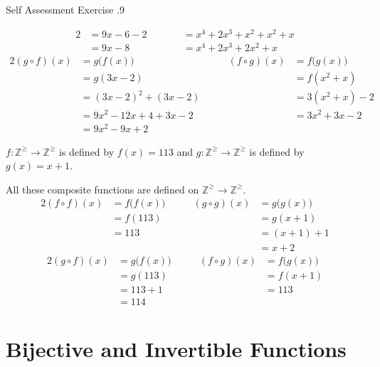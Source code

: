 \documentclass[\main/notes.tex]{subfiles}
\begin{document}
\begin{exercise}{Self Assessment Exercise \thechapter.9}
\begin{questions}
\begin{questions}
\begin{answer}
\begin{alignat*}{2}
										&= 9x - 6 - 2 \qquad & &= x^{4} + 2x^{3} + x^{2} + x^{2} + x\\
										&= 9x - 8 \qquad & &= x^{4} + 2x^{3} + 2x^{2} + x
									\end{alignat*}
									\begin{alignat*}{2}
										(g \circ f)(x) &= g\bigl(f(x)\bigr) \qquad & (f \circ g)(x) &= f\bigl(g(x)\bigr)\\
										&= g(3x - 2) \qquad & &= f\left(x^{2} + x\right)\\
										&= (3x - 2)^{2} + (3x - 2) \qquad & &= 3\left(x^{2} + x\right) - 2\\
										&= 9x^{2} - 12x + 4 + 3x - 2 \qquad & &= 3x^{2} + 3x - 2\\
										&= 9x^{2} - 9x + 2
									\end{alignat*}
								\end{answer}
							\pagebreak
							\item $f: \mathbb{Z}^{\geq} \rightarrow \mathbb{Z}^{\geq}$ is defined by $f(x) = 113$ and $g: \mathbb{Z}^{\geq} \rightarrow \mathbb{Z}^{\geq}$ is defined by $g(x) = x + 1$.\\
								\begin{answer}
									All these composite functions are defined on $\mathbb{Z}^{\geq} \rightarrow \mathbb{Z}^{\geq}$.
									\begin{alignat*}{2}
										(f \circ f)(x) &= f\bigl(f(x)\bigr) \qquad & (g \circ g)(x) &= g\bigl(g(x)\bigr)\\
										&= f(113) \qquad & &= g(x + 1)\\
										&= 113 \qquad & &= (x + 1) + 1\\
										& \qquad & &= x + 2
									\end{alignat*}
									\begin{alignat*}{2}
										(g \circ f)(x) &= g\bigl(f(x)\bigr) \qquad & (f \circ g)(x) &= f\bigl(g(x)\bigr)\\
										&= g(113) \qquad & &= f(x + 1)\\
										&= 113 + 1 \qquad & &= 113\\
										&= 114
									\end{alignat*}
								\end{answer}
						\end{questions}
				\end{questions}
			\end{exercise}
		\section{Bijective and Invertible Functions}
\end{document}
